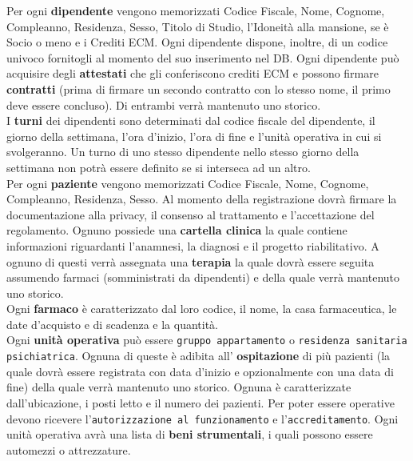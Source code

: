 \documentclass[a4paper, 12pt]{report}
\newenvironment{changemargin}[2]{%
  \begin{list}{}{%
    \setlength{\topsep}{0pt}%
    \setlength{\leftmargin}{#1}%
    \setlength{\rightmargin}{#2}%
    \setlength{\listparindent}{\parindent}%
    \setlength{\itemindent}{\parindent}%
    \setlength{\parsep}{\parskip}%
  }%
  \item[]}{\end{list}}
\begin{document}
\begin{changemargin}{0.5cm}{0.5cm}
        \noindent
        Per ogni \textbf{dipendente} vengono memorizzati Codice Fiscale, Nome, Cognome, Compleanno, Residenza, Sesso, Titolo di Studio,
        l'Idoneità alla mansione, se è Socio o meno e i Crediti ECM. Ogni dipendente dispone, inoltre, di un codice univoco fornitogli
        al momento del suo inserimento nel DB. 
        Ogni dipendente può acquisire degli \textbf{attestati} che gli conferiscono crediti ECM e possono firmare
        \textbf{contratti} (prima di firmare un secondo contratto con lo stesso nome, il primo deve essere concluso).
        Di entrambi verrà mantenuto uno storico.\\
        I \textbf{turni} dei dipendenti sono determinati dal codice fiscale del dipendente, il giorno della settimana, 
        l'ora d'inizio, l'ora di fine e l'unità operativa in cui si svolgeranno. Un turno di uno stesso dipendente nello stesso
        giorno della settimana non potrà essere definito se si interseca ad un altro.\\
        Per ogni \textbf{paziente} vengono memorizzati Codice Fiscale, Nome, Cognome, Compleanno, Residenza, Sesso.
        Al momento della registrazione dovrà firmare la documentazione alla privacy, il consenso al trattamento e l'accettazione
        del regolamento. Ognuno possiede una \textbf{cartella clinica} la quale contiene informazioni riguardanti
        l'anamnesi, la diagnosi e il progetto riabilitativo. A ognuno di questi verrà assegnata una 
        \textbf{terapia} la quale dovrà essere seguita assumendo farmaci (somministrati da dipendenti) e della quale
        verrà mantenuto uno storico.\\
        Ogni \textbf{farmaco} è caratterizzato dal loro codice, il nome, la casa farmaceutica, le date d'acquisto e
        di scadenza e la quantità.\\
        Ogni \textbf{unità operativa} può essere \texttt{gruppo appartamento} o \texttt{residenza sanitaria psichiatrica}.
        Ognuna di queste è adibita all' \textbf{ospitazione} di più pazienti (la quale dovrà essere registrata
        con data d'inizio e opzionalmente con una data di fine) della quale verrà mantenuto uno storico.
        Ognuna è caratterizzate dall'ubicazione, i posti letto e il numero dei pazienti.
        Per poter essere operative devono ricevere l'\texttt{autorizzazione al funzionamento} e l'\texttt{accreditamento}.
        Ogni unità operativa avrà una lista di \textbf{beni strumentali}, i quali possono essere automezzi o attrezzature.
        \newline
\end{changemargin}
\end{document}
